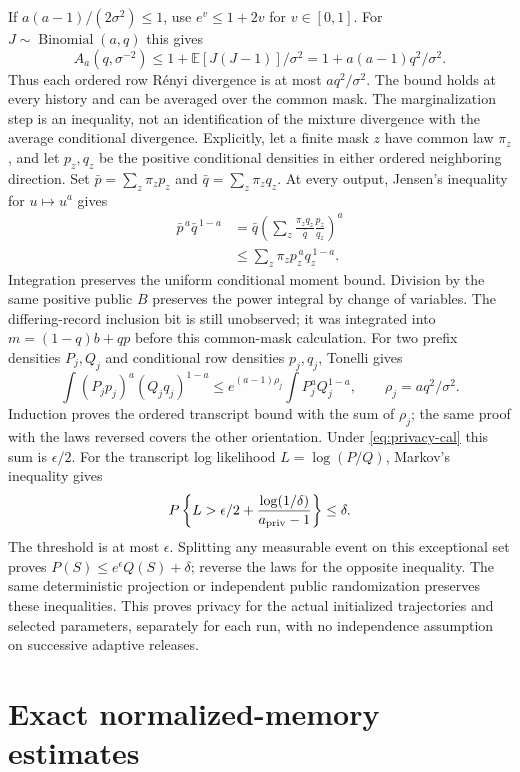 \documentclass[a4paper,11pt]{article}
\theoremstyle{remark}
\newcommand{\E}{\mathbb E}
\begin{document}
If $a(a-1)/(2\sigma^2)\le1$, use $e^v\le1+2v$ for $v\in[0,1]$.
For $J\sim\operatorname{Binomial}(a,q)$ this gives
\[
 A_a(q,\sigma^{-2})
 \le1+\E[J(J-1)]/\sigma^2
 =1+a(a-1)q^2/\sigma^2.
\]
Thus each ordered row R\'enyi divergence is at most $aq^2/\sigma^2$.
The bound holds at every history and can be averaged over the common mask.
The marginalization step is an inequality, not an identification of the
mixture divergence with the average conditional divergence. Explicitly,
let a finite mask $z$ have common law $\pi_z$, and let $p_z,q_z$ be the
positive conditional densities in either ordered neighboring direction.
Set $\bar p=\sum_z\pi_zp_z$ and $\bar q=\sum_z\pi_zq_z$. At every output,
Jensen's inequality for $u\mapsto u^a$ gives
\begin{align*}
 \bar p^{\,a}\bar q^{\,1-a}
 &=\bar q\left(\sum_z\frac{\pi_zq_z}{\bar q}
                         \frac{p_z}{q_z}\right)^a\\
 &\le\sum_z\pi_zp_z^{\,a}q_z^{\,1-a}.
\end{align*}
Integration preserves the uniform conditional moment bound. Division by
the same positive public $B$ preserves the power integral by change of
variables. The differing-record inclusion bit is still unobserved; it was
integrated into $m=(1-q)b+qp$ before this common-mask calculation.
For two prefix densities $P_j,Q_j$ and conditional row densities $p_j,q_j$,
Tonelli gives
\[
 \int(P_jp_j)^a(Q_jq_j)^{1-a}
 \le e^{(a-1)\rho_j}\int P_j^aQ_j^{1-a},\qquad
 \rho_j=aq^2/\sigma^2.
\]
Induction proves the ordered transcript bound with the sum of $\rho_j$;
the same proof with the laws reversed covers the other orientation.
Under \eqref{eq:privacy-cal} this sum is $\epsilon/2$.
For the transcript log likelihood $L=\log(P/Q)$, Markov's inequality gives
\[
 P\left\{L>\epsilon/2+\frac{\log(1/\delta)}{a_{\rm priv}-1}\right\}
 \le\delta.
\]
The threshold is at most $\epsilon$. Splitting any measurable event on
this exceptional set proves $P(S)\le e^\epsilon Q(S)+\delta$;
reverse the laws for the opposite inequality. The same deterministic
projection or independent public randomization preserves these inequalities.
This proves privacy for the actual initialized trajectories and selected
parameters, separately for each run, with no independence assumption on
successive adaptive releases.

\section{Exact normalized-memory estimates}\label{app:sharp}
\end{document}
